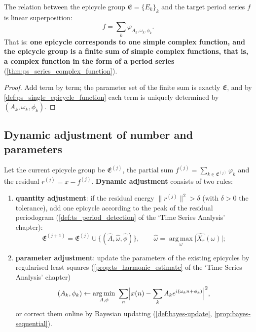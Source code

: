 \begin{proposition}\label{prop:ps_group_as_function}
The relation between the epicycle group $\mathfrak{E}=\{E_k\}_k$ and the target period series $f$ is linear superposition:
\[
f=\sum_k\varphi_{A_k,\omega_k,\phi_k}.
\]
That is: \textbf{one epicycle corresponds to one simple complex function, and the epicycle group is a finite sum of simple complex functions, that is, a complex function in the form of a period series} (\cref{thm:ps_series_complex_function}).
\end{proposition}

\begin{proof}
Add term by term; the parameter set of the finite sum is exactly $\mathfrak{E}$, and by \cref{def:ps_single_epicycle_function} each term is uniquely determined by $(A_k,\omega_k,\phi_k)$.
\end{proof}

\subsection{Dynamic adjustment of number and parameters}

\begin{definition}\label{def:ps_adaptive_adjustment}
Let the current epicycle group be $\mathfrak{E}^{(j)}$, the partial sum $f^{(j)}=\sum_{k\in\mathfrak{E}^{(j)}}\varphi_k$ and the residual $r^{(j)}=x-f^{(j)}$. \textbf{Dynamic adjustment} consists of two rules:
\begin{enumerate}[label=(\roman*)]
    \item \textbf{quantity adjustment}: if the residual energy $\|r^{(j)}\|^2>\delta$ (with $\delta>0$ the tolerance), add one epicycle according to the peak of the residual periodogram (\cref{def:ts_period_detection} of the `Time Series Analysis' chapter):
    \[
    \mathfrak{E}^{(j+1)}=\mathfrak{E}^{(j)}\cup\{(\hat A,\hat\omega,\hat\phi)\},\qquad
    \hat\omega=\operatorname*{arg\,max}_{\omega}\bigl|\widehat{X_{r}}(\omega)\bigr|;
    \]
    \item \textbf{parameter adjustment}: update the parameters of the existing epicycles by regularised least squares (\cref{prop:ts_harmonic_estimate} of the `Time Series Analysis' chapter)
    \[
    (A_k,\phi_k)\leftarrow\operatorname*{arg\,min}_{A,\phi}\ \sum_n\Bigl|x(n)-\sum_kA_ke^{i(\omega_kn+\phi_k)}\Bigr|^2,
    \]
    or correct them online by Bayesian updating (\cref{def:bayes-update}, \cref{prop:bayes-sequential}).
\end{enumerate}
\end{definition}

